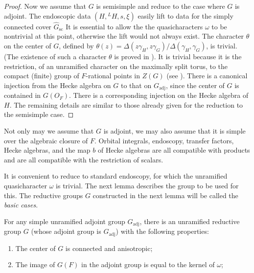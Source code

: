 \documentclass{amsart}
\newenvironment{cthm}[1]
  {\renewcommand\thethm{\sc #1}\thm}
  {\endthm}
\newcommand\s{{\text{sc}}}
\begin{document}
\begin{proof}
Now we assume that $G$ is semisimple and reduce to the case where $G$
is adjoint.  The endoscopic data $(H,{}^L\!H,s,\xi)$ easily lift
to data for the simply connected cover $\hat G_{\s}$
It is essential to allow
the the quasicharacters $\omega$ to be nontrivial
at this point, otherwise the lift would not always exist.  The character
$\theta$ on the center of $G$, defined by 
$\theta(z) =\Delta(z\gamma_H,z\gamma_G)/\Delta(\gamma_H,\gamma_G)$,
is trivial.  (The existence of such  a character
$\theta$ is proved in \cite{LS2}).  It
is trivial because it is the restriction, 
of an unramified character on the maximally split torus,
to the compact (finite) group of $F$-rational points in $Z(G)$
(see \cite{H2,11}).
There is a canonical injection from the Hecke algebra on $G$
to that on $G_{\text{adj}}$, since the center of $G$
is contained in $G(O_F)$.  There
is a corresponding injection on the Hecke algebra of $H$.  The
remaining details are similar to those already given for the reduction
to the semisimple case.\end{proof}



Not only may we assume that $G$ is adjoint, we may also assume
that it is simple over the algebraic closure of $F$.  Orbital
integrals, endoscopy, transfer factors, Hecke algebras, and
the map $b$ of Hecke algebras are all compatible with products
and are all compatible with the restriction of scalars.

It is convenient
to reduce to standard endoscopy, for which the unramified quasicharacter
$\omega$ is trivial.  The next lemma describes the
group to be used for this.
The reductive groups $G$ constructed in the next lemma will be called the
{\it basic cases}.

\begin{cthm}{Lemma 3.7}  For any simple 
unramified adjoint group $G_{\text{adj}}$,
there is an unramified reductive group $G$
(whose adjoint group is $G_{\text{adj}}$) with the following properties:
\begin{enumerate}[label=(\arabic*)]
\item  The center of $G$ is connected and anisotropic;
\item The image of $G(F)$ in the adjoint group is equal to the
kernel of $\omega$;
\end{enumerate}
\end{cthm}
\end{document}
